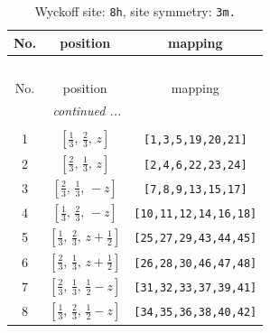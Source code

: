 \documentclass[fleqn,8pt]{jsarticle}
\begin{document}
\begin{longtable}{ccc}
\caption{Wyckoff site: {\tt 8h}, site symmetry: {\tt 3m.}}
 \\
 \hline \hline
No. & position & mapping \\ \hline \endfirsthead

\multicolumn{2}{l}{\tablename\ \thetable{}} \\
 \hline \hline
No. & position & mapping \\ \hline \endhead

 \hline \hline
\multicolumn{2}{r}{\footnotesize\it continued ...} \\ \endfoot

 \hline \hline
\multicolumn{2}{r}{} \\ \endlastfoot

1 & $\left[ \frac{1}{3},\, \frac{2}{3},\, z \right]$ & {\tt [1,3,5,19,20,21]} \\ \hline
2 & $\left[ \frac{2}{3},\, \frac{1}{3},\, z \right]$ & {\tt [2,4,6,22,23,24]} \\ \hline
3 & $\left[ \frac{2}{3},\, \frac{1}{3},\, - z \right]$ & {\tt [7,8,9,13,15,17]} \\ \hline
4 & $\left[ \frac{1}{3},\, \frac{2}{3},\, - z \right]$ & {\tt [10,11,12,14,16,18]} \\ \hline
5 & $\left[ \frac{1}{3},\, \frac{2}{3},\, z + \frac{1}{2} \right]$ & {\tt [25,27,29,43,44,45]} \\ \hline
6 & $\left[ \frac{2}{3},\, \frac{1}{3},\, z + \frac{1}{2} \right]$ & {\tt [26,28,30,46,47,48]} \\ \hline
7 & $\left[ \frac{2}{3},\, \frac{1}{3},\, \frac{1}{2} - z \right]$ & {\tt [31,32,33,37,39,41]} \\ \hline
8 & $\left[ \frac{1}{3},\, \frac{2}{3},\, \frac{1}{2} - z \right]$ & {\tt [34,35,36,38,40,42]} \\
\end{longtable}
\renewcommand{\arraystretch}{1.2}
\end{document}
